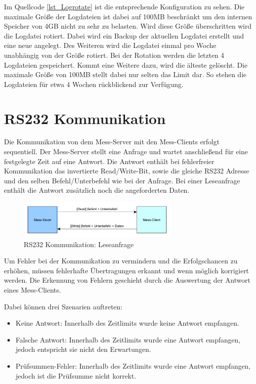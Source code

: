 Im Quellcode \ref{lst_Logrotate} ist die entsprechende Konfiguration zu sehen. Die maximale Größe der Logdateien ist dabei auf 100MB beschränkt um den internen Speicher von 4GB nicht zu sehr zu belasten. Wird diese Größe überschritten wird die Logdatei rotiert. Dabei wird ein Backup der aktuellen Logdatei erstellt und eine neue angelegt. Des Weiteren wird die Logdatei einmal pro Woche unabhängig von der Größe rotiert. Bei der Rotation werden die letzten 4 Logdateien gespeichert. Kommt eine Weitere dazu, wird die älteste gelöscht. Die maximale Größe von 100MB stellt dabei nur selten das Limit dar. So stehen die Logdateien für etwa 4 Wochen rückblickend zur Verfügung.



\section{RS232 Kommunikation}

Die Kommunikation von dem Mess-Server mit den Mess-Clients erfolgt sequentiell. Der Mess-Server stellt eine Anfrage und wartet anschließend für eine festgelegte Zeit auf eine Antwort. Die Antwort enthält bei fehlerfreier Kommunikation das invertierte Read/Write-Bit, sowie die gleiche RS232 Adresse und den selben Befehl/Unterbefehl wie bei der Anfrage. Bei einer Leseanfrage enthält die Antwort zusätzlich noch die angeforderten Daten.\\

\begin{figure}[H]
\begin{center}
\includegraphics[width=0.7\textwidth ]{img/general/RS232Uebertragung.pdf}
\caption{RS232 Kommunikation: Leseanfrage}
\label{figure_RS232Kommunikation}
\end{center}
\end{figure}

Um Fehler bei der Kommunikation zu vermindern und die Erfolgschancen zu erhöhen, müssen fehlerhafte Übertragungen erkannt und wenn möglich korrigiert werden. Die Erkennung von Fehlern geschieht durch die Auswertung der Antwort eines Mess-Clients.

Dabei können drei Szenarien auftreten:
\begin{itemize}
\item Keine Antwort: Innerhalb des Zeitlimits wurde keine Antwort empfangen.
\item Falsche Antwort: Innerhalb des Zeitlimits wurde eine Antwort empfangen, jedoch entspricht sie nicht den Erwartungen.
\item Prüfsummen-Fehler: Innerhalb des Zeitlimits wurde eine Antwort empfangen, jedoch ist die Prüfsumme nicht korrekt.
\end{itemize}

